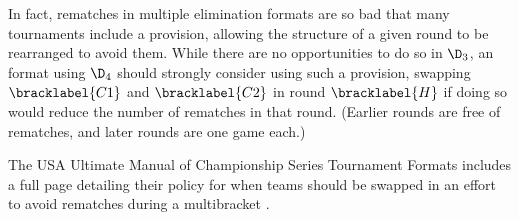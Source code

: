 {    In fact, rematches in multiple elimination formats are so bad that many tournaments include a provision, allowing the structure of a given round to be rearranged to avoid them. While there are no opportunities to do so in $\D_3$, an format using $\D_4$ should strongly consider using such a provision, swapping $\bracklabel{C1}$ and $\bracklabel{C2}$ in round $\bracklabel{H}$ if doing so would reduce the number of rematches in that round. (Earlier rounds are free of rematches, and later rounds are one game each.)


   The USA Ultimate Manual of Championship Series Tournament Formats includes a full page detailing their policy for when teams should be swapped in an effort to avoid rematches during a multibracket \cite{ultimate}.







}

